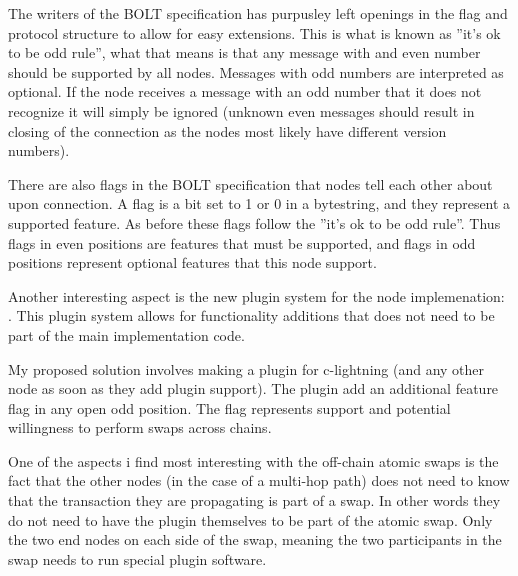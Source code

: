 The writers of the BOLT specification has purpusley left openings in the
flag and protocol structure to allow for easy extensions. This is what is known
as ''it's ok to be odd rule'', what that means is that any  message with
and even number should be supported by all nodes. Messages with odd numbers 
are interpreted as optional. If the node receives a message with an odd number 
that it does not recognize it will simply be ignored (unknown even messages 
should result in closing of the connection as the nodes most likely
have different version numbers).

There are also flags in the BOLT specification that nodes tell each other about
upon connection. A flag is a bit set to 1 or 0 in a bytestring, and they 
represent a supported feature. As before these
flags follow the ''it's ok to be odd rule''. Thus flags in even positions are 
features that must be supported, and flags in odd positions represent optional
features that this node support.


Another interesting aspect is the new plugin system for the node implemenation: 
. This plugin system allows for functionality additions that
does not need to be part of the main implementation code. 

My proposed solution involves making a plugin for c-lightning (and any other 
node as soon as they add plugin support). The plugin add an additional 
feature flag in any open odd position. The flag represents support and potential
willingness to perform swaps across chains. 

One of the aspects i find most interesting with the off-chain atomic swaps is
the fact that the other nodes (in the case of a multi-hop path) does not need
to know that the transaction they are propagating is part of a swap. In other 
words they do not need to have the plugin themselves to be part of the atomic
swap. Only the two end nodes on each side of the swap, meaning the two 
participants in the swap needs to run special plugin software. 



